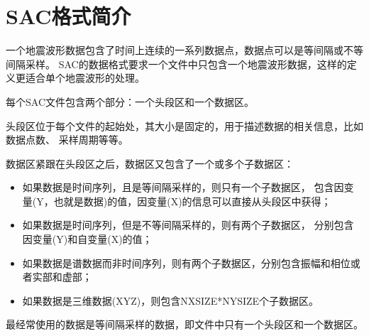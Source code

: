 \section{SAC格式简介}
一个地震波形数据包含了时间上连续的一系列数据点，数据点可以是等间隔或不等间隔采样。
SAC的数据格式要求一个文件中只包含一个地震波形数据，这样的定义更适合单个地震波形的处理。

每个SAC文件包含两个部分：一个头段区和一个数据区。

头段区位于每个文件的起始处，其大小是固定的，用于描述数据的相关信息，比如数据点数、
采样周期等等。

数据区紧跟在头段区之后，数据区又包含了一个或多个子数据区：
\begin{itemize}
\item 如果数据是时间序列，且是等间隔采样的，则只有一个子数据区，
    包含因变量(Y，也就是数据)的值，因变量(X)的信息可以直接从头段区中获得；
\item 如果数据是时间序列，但是不等间隔采样的，则有两个子数据区，
    分别包含因变量(Y)和自变量(X)的值；
\item 如果数据是谱数据而非时间序列，则有两个子数据区，分别包含振幅和相位或者实部和虚部；
\item 如果数据是三维数据(XYZ)，则包含NXSIZE*NYSIZE个子数据区。
\end{itemize}
最经常使用的数据是等间隔采样的数据，即文件中只有一个头段区和一个数据区。
